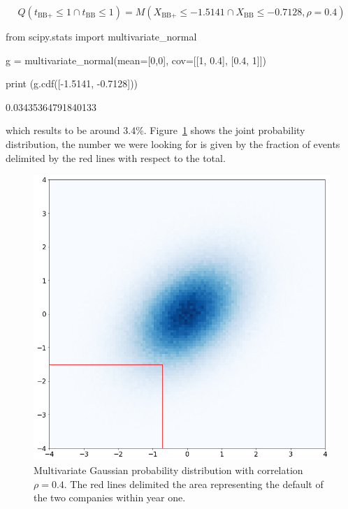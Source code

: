 \begin{solution}
\begin{equation*}
Q(t_{\textrm{BB+}}\leq 1 \cap t_{\textrm{BB}}\leq 1) = M(X_{\textrm{BB+}}\leq -1.5141 \cap X_{\textrm{BB}}\leq -0.7128, \rho=0.4)
\end{equation*}

\begin{ipython}
from scipy.stats import multivariate_normal

g = multivariate_normal(mean=[0,0],
                        cov=[[1, 0.4],
                             [0.4, 1]])

print (g.cdf([-1.5141, -0.7128]))
\end{ipython}
\begin{ioutput}
0.03435364791840133
\end{ioutput}
\noindent
which results to be around 3.4\%. Figure~\ref{fig:copula_no_marginals} shows the joint probability distribution, the number we were looking for is given by the fraction of events delimited by the red lines with respect to the total.

\begin{figure}[htbp]
\centering
\includegraphics[width=0.5\linewidth]{figures/copula_no_marginals}
\caption{Multivariate Gaussian probability distribution with correlation $\rho=0.4$. The red lines delimited the area representing the default of the two companies within year one.}
\label{fig:copula_no_marginals}
\end{figure}
\end{solution}